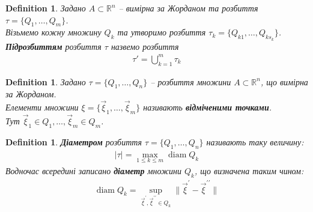 \documentclass[a4paper, 10pt]{article}
\DeclareMathOperator*\diam{diam}
\theoremstyle{theoremdd}
\theoremstyle{theoremdd}
\newtheorem{definition}[theorem]{Definition}
\theoremstyle{theoremdd}
\theoremstyle{theoremdd}
\theoremstyle{theoremdd}
\theoremstyle{theoremdd}
\theoremstyle{theoremdd}
\theoremstyle{theoremdd}
\theoremstyle{theoremdd}
\theoremstyle{theoremdd}
\theoremstyle{theoremdd}
\theoremstyle{theoremdd}
\theoremstyle{theoremdd}
\theoremstyle{theoremdd}
\theoremstyle{theoremdd}
\begin{document}
\begin{definition}
Задано $A \subset \mathbb{R}^n$ -- вимірна за Жорданом та розбиття $\tau = \{Q_1,\dots,Q_m\}$.\\
Візьмемо кожну множину $Q_k$ та утворимо розбиття $\tau_k = \{Q_{k1},\dots,Q_{ks_k}\}$.\\
\textbf{Підрозбиттям} розбиття $\tau$ назвемо розбиття
\begin{align*}
\tau' = \bigcup_{k=1}^m \tau_k
\end{align*}
\end{definition}

\iffalse
\begin{definition}
Задано $P \subset \mathbb{R}^n$ - паралелепіпед.\\
\textbf{Стандартним розбиттям} паралелепіпеду $P$ назвемо множину $\tau = \{P_{j_1,\dots,j_n}: j_1=1,\dots,m_1;\dots;j_n=1,\dots,m_n\}$, де спочатку ми утворили розбиття відрізків $[a_k,b_k], k = \overline{1,n}$, а потім отримали $P_{j_1,\dots,j_n} = [x^{(1)}_{j_1-1},x^{(1)}_{j_1}] \times \dots \times [x^{(n)}_{j_n-1},x^{(n)}_{j_n}]$.\\
Коротше паралелепіпед ми розбили на більш маленькі паралелепіпеди.
\end{definition}

\begin{definition}
Задано $A \subset \mathbb{R}^n$ - вимірна за Жорданом.\\
\textbf{Стандартним розбиттям} множини $A$ називають розбиття \\ $\tau = \{Q_{j_1,\dots,j_n} = P_{j_1,\dots,j_n} \cap A, Q_{j_1,\dots,j_n} \neq \emptyset\}$.
\end{definition}
\fi

\begin{definition}
Задано $\tau = \{Q_1,\dots,Q_n\}$ -- розбиття множини $A \subset \mathbb{R}^n$, що вимірна за Жорданом.\\
Елементи множини $\xi = \{\vec{\xi}_1, \dots, \vec{\xi}_m \}$ називають \textbf{відміченими точками}.\\
Тут $\vec{\xi}_1 \in Q_1, \dots, \vec{\xi}_m \in Q_m$.
\end{definition}

\begin{definition}
\textbf{Діаметром} розбиття $\tau = \{Q_1,\dots,Q_n\}$ називають таку величину:
\begin{align*}
|\tau| = \max_{1 \leq k \leq m} \diam Q_k
\end{align*}
Водночас всередині записано \textbf{діаметр} множини $Q_k$, що визначена таким чином:
\begin{align*}
\diam Q_k = \sup_{\vec{\xi}^\prime, \vec{\xi}^{\prime \prime} \in Q_k} \|\vec{\xi}^\prime - \vec{\xi}^{\prime \prime}\|
\end{align*}
\end{definition}
\end{document}
